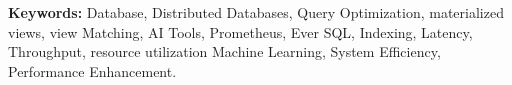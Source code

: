 
\noindent \textbf{Keywords:} Database, Distributed Databases, Query Optimization, materialized views, view Matching, AI Tools, Prometheus, Ever SQL, Indexing, Latency, Throughput, resource utilization Machine Learning, System Efficiency, Performance Enhancement.

 

